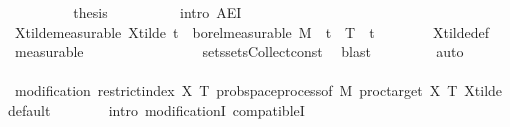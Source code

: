 \begin{isabellebody}
\ \ \ \ \ \ \isamarkupfalse%
\ \isamarkupfalse%
\ {\isacharquery}{\kern0pt}thesis\isanewline
\ \ \ \ \ \ \ \ \isamarkupfalse%
\ {\isacharparenleft}{\kern0pt}intro\ AE{\isacharunderscore}{\kern0pt}I{\isacharparenright}{\kern0pt}\isanewline
\ \ \ \ \ \ \ \ \isamarkupfalse%
\isanewline
\ \ \ \ \isamarkupfalse%
\isanewline
\ \ \ \ \isamarkupfalse%
\ \isamarkupfalse%
\ X{\isacharunderscore}{\kern0pt}tilde{\isacharunderscore}{\kern0pt}measurable{\isacharcolon}{\kern0pt}\ {\isachardoublequoteopen}X{\isacharunderscore}{\kern0pt}tilde\ t\ {\isasymin}\ borel{\isacharunderscore}{\kern0pt}measurable\ {\isacharquery}{\kern0pt}M{\isachardoublequoteclose}\ \ {\isachardoublequoteopen}t\ {\isasymin}\ {\isacharbraceleft}{\kern0pt}{}{\isachardot}{\kern0pt}{\isachardot}{\kern0pt}T{\isacharbraceright}{\kern0pt}{\isachardoublequoteclose}\ \ t\isanewline
\ \ \ \ \ \ \isamarkupfalse%
\ X{\isacharunderscore}{\kern0pt}tilde{\isacharunderscore}{\kern0pt}def\ \isamarkupfalse%
\ measurable\isanewline
\ \ \ \ \ \ \ \ \isamarkupfalse%
\isanewline
\ \ \ \ \ \ \isamarkupfalse%
\ sets{\isachardot}{\kern0pt}sets{\isacharunderscore}{\kern0pt}Collect{\isacharunderscore}{\kern0pt}const\ \isamarkupfalse%
\ blast\isanewline
\ \ \ \ \ \ \ \isamarkupfalse%
\ auto{\isacharbrackleft}{\kern0pt}{}{\isacharbrackright}{\kern0pt}\isanewline
\ \ \ \ \ \ \isamarkupfalse%
\ \isanewline
\ \ \ \ \isamarkupfalse%
\ \isamarkupfalse%
\ {\isachardoublequoteopen}modification\ {\isacharparenleft}{\kern0pt}restrict{\isacharunderscore}{\kern0pt}index\ X\ {\isacharbraceleft}{\kern0pt}{}{\isachardot}{\kern0pt}{\isachardot}{\kern0pt}T{\isacharbraceright}{\kern0pt}{\isacharparenright}{\kern0pt}\ {\isacharparenleft}{\kern0pt}prob{\isacharunderscore}{\kern0pt}space{\isachardot}{\kern0pt}process{\isacharunderscore}{\kern0pt}of\ {\isacharquery}{\kern0pt}M\ {\isacharparenleft}{\kern0pt}proc{\isacharunderscore}{\kern0pt}target\ X{\isacharparenright}{\kern0pt}\ {\isacharbraceleft}{\kern0pt}{}{\isachardot}{\kern0pt}{\isachardot}{\kern0pt}T{\isacharbraceright}{\kern0pt}\ X{\isacharunderscore}{\kern0pt}tilde\ default{\isacharparenright}{\kern0pt}{\isachardoublequoteclose}\isanewline
\ \ \ \ \ \ \isamarkupfalse%
\ {\isacharparenleft}{\kern0pt}intro\ modificationI\ compatibleI{\isacharparenright}{\kern0pt}\isanewline

\end{isabellebody}
